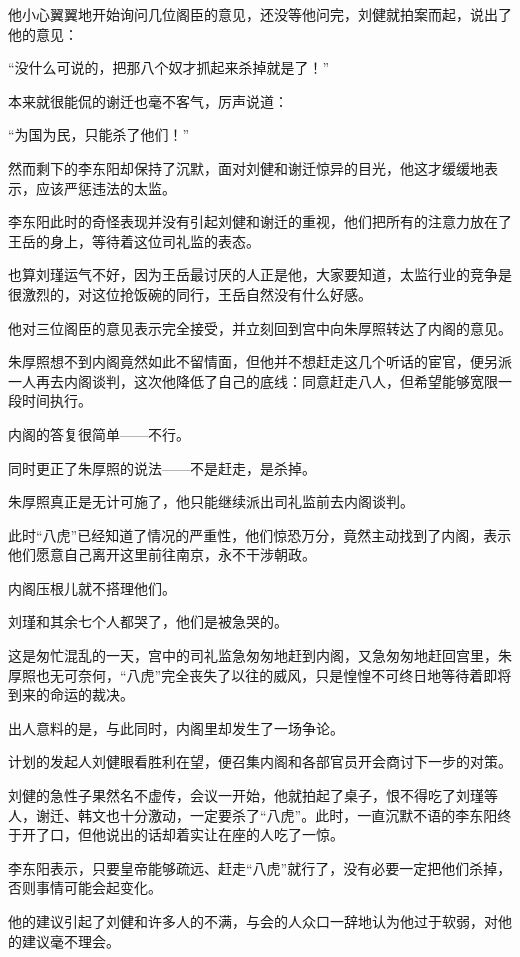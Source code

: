 \begin{multicols}{\theparacolNo}
		他小心翼翼地开始询问几位阁臣的意见，还没等他问完，刘健就拍案而起，说出了他的意见：

		“没什么可说的，把那八个奴才抓起来杀掉就是了！”

		本来就很能侃的谢迁也毫不客气，厉声说道：

		“为国为民，只能杀了他们！”

		然而剩下的李东阳却保持了沉默，面对刘健和谢迁惊异的目光，他这才缓缓地表示，应该严惩违法的太监。

		李东阳此时的奇怪表现并没有引起刘健和谢迁的重视，他们把所有的注意力放在了王岳的身上，等待着这位司礼监的表态。

		也算刘瑾运气不好，因为王岳最讨厌的人正是他，大家要知道，太监行业的竞争是很激烈的，对这位抢饭碗的同行，王岳自然没有什么好感。

		他对三位阁臣的意见表示完全接受，并立刻回到宫中向朱厚照转达了内阁的意见。

		朱厚照想不到内阁竟然如此不留情面，但他并不想赶走这几个听话的宦官，便另派一人再去内阁谈判，这次他降低了自己的底线：同意赶走八人，但希望能够宽限一段时间执行。

		内阁的答复很简单——不行。

		同时更正了朱厚照的说法——不是赶走，是杀掉。

		朱厚照真正是无计可施了，他只能继续派出司礼监前去内阁谈判。

		此时“八虎”已经知道了情况的严重性，他们惊恐万分，竟然主动找到了内阁，表示他们愿意自己离开这里前往南京，永不干涉朝政。

		内阁压根儿就不搭理他们。

		刘瑾和其余七个人都哭了，他们是被急哭的。

		这是匆忙混乱的一天，宫中的司礼监急匆匆地赶到内阁，又急匆匆地赶回宫里，朱厚照也无可奈何，“八虎”完全丧失了以往的威风，只是惶惶不可终日地等待着即将到来的命运的裁决。

		出人意料的是，与此同时，内阁里却发生了一场争论。

		计划的发起人刘健眼看胜利在望，便召集内阁和各部官员开会商讨下一步的对策。

		刘健的急性子果然名不虚传，会议一开始，他就拍起了桌子，恨不得吃了刘瑾等人，谢迁、韩文也十分激动，一定要杀了“八虎”。此时，一直沉默不语的李东阳终于开了口，但他说出的话却着实让在座的人吃了一惊。

		李东阳表示，只要皇帝能够疏远、赶走“八虎”就行了，没有必要一定把他们杀掉，否则事情可能会起变化。

		他的建议引起了刘健和许多人的不满，与会的人众口一辞地认为他过于软弱，对他的建议毫不理会。


\end{multicols}

